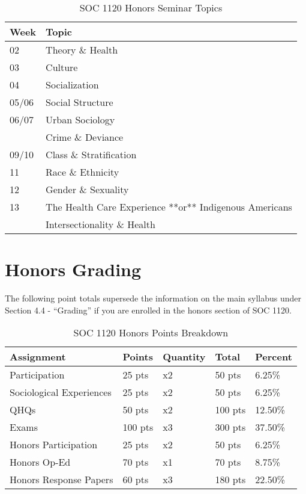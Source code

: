 \documentclass[]{book}
\begin{document}
\begin{table}[t]

\caption{\label{tab:unnamed-chunk-4}SOC 1120 Honors Seminar Topics}
\centering
\begin{tabular}{ll}
\toprule
Week & Topic\\
\midrule
02 & Theory \& Health\\
03 & Culture\\
04 & Socialization\\
05/06 & Social Structure\\
06/07 & Urban Sociology\\
\addlinespace
08 & Crime \& Deviance\\
09/10 & Class \& Stratification\\
11 & Race \& Ethnicity\\
12 & Gender \& Sexuality\\
13 & The Health Care Experience **or** Indigenous Americans\\
\addlinespace
14 & Intersectionality \& Health\\
\bottomrule
\end{tabular}
\end{table}

\hypertarget{honors-grading}{%
\section{Honors Grading}\label{honors-grading}}

The following point totals supersede the information on the main syllabus under Section 4.4 - ``Grading'' if you are enrolled in the honors section of SOC 1120.

\begin{table}[t]

\caption{\label{tab:unnamed-chunk-5}SOC 1120 Honors Points Breakdown}
\centering
\begin{tabular}{lllll}
\toprule
Assignment & Points & Quantity & Total & Percent\\
\midrule
Participation & 25 pts & x2 & 50 pts & 6.25\%\\
Sociological Experiences & 25 pts & x2 & 50 pts & 6.25\%\\
QHQs & 50 pts & x2 & 100 pts & 12.50\%\\
Exams & 100 pts & x3 & 300 pts & 37.50\%\\
Honors Participation & 25 pts & x2 & 50 pts & 6.25\%\\
\addlinespace
Honors Op-Ed & 70 pts & x1 & 70 pts & 8.75\%\\
Honors Response Papers & 60 pts & x3 & 180 pts & 22.50\%\\
\bottomrule
\end{tabular}
\end{table}
\end{document}
